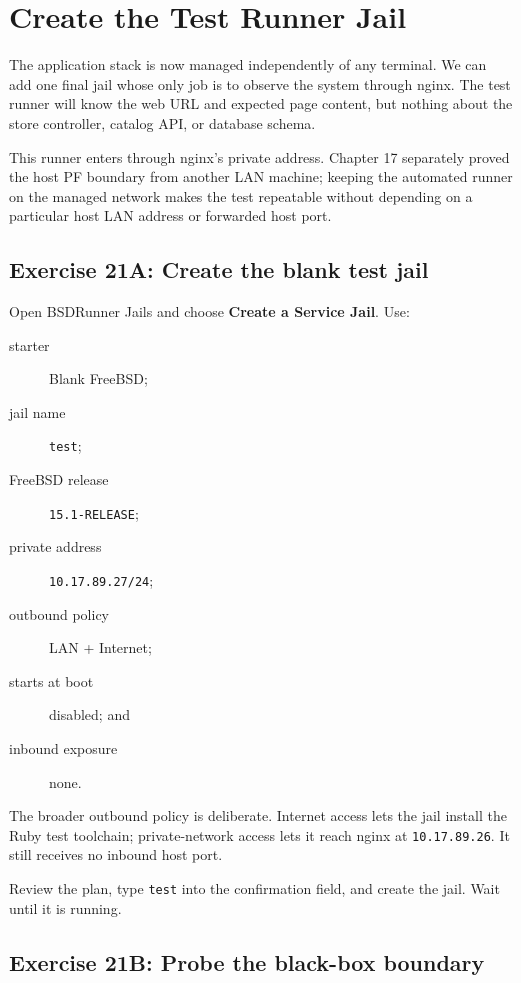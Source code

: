 \chapter{Create the Test Runner Jail}

The application stack is now managed independently of any terminal. We can add
one final jail whose only job is to observe the system through nginx. The test
runner will know the web URL and expected page content, but nothing about the
store controller, catalog API, or database schema.

This runner enters through nginx's private address. Chapter 17 separately
proved the host PF boundary from another LAN machine; keeping the automated
runner on the managed network makes the test repeatable without depending on a
particular host LAN address or forwarded host port.

\section{Exercise 21A: Create the blank test jail}

Open BSDRunner Jails and choose \textbf{Create a Service Jail}. Use:

\begin{description}
  \item[starter] Blank FreeBSD;
  \item[jail name] \texttt{test};
  \item[FreeBSD release] \texttt{15.1-RELEASE};
  \item[private address] \texttt{10.17.89.27/24};
  \item[outbound policy] LAN + Internet;
  \item[starts at boot] disabled; and
  \item[inbound exposure] none.
\end{description}

The broader outbound policy is deliberate. Internet access lets the jail
install the Ruby test toolchain; private-network access lets it reach nginx at
\texttt{10.17.89.26}. It still receives no inbound host port.

Review the plan, type \texttt{test} into the confirmation field, and create the
jail. Wait until it is running.

\section{Exercise 21B: Probe the black-box boundary}


